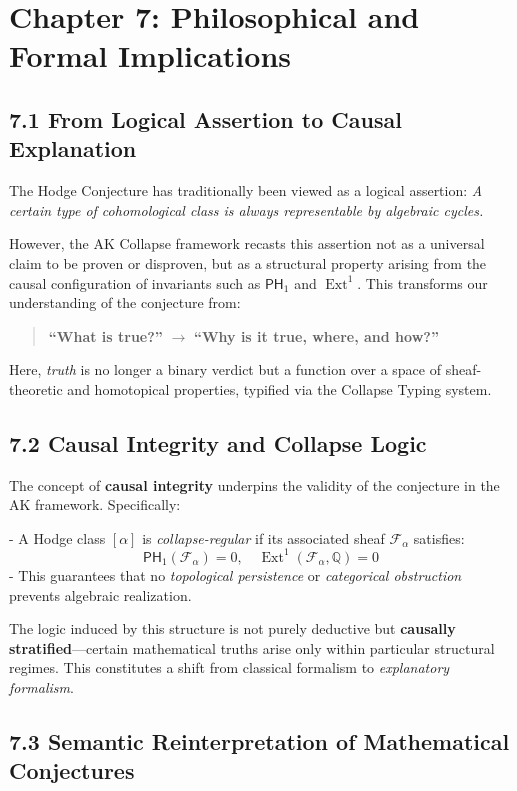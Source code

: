 \documentclass[11pt]{article}
\DeclareMathOperator{\Ext}{Ext}
\begin{document}
\section{Chapter 7: Philosophical and Formal Implications}

\subsection{7.1 From Logical Assertion to Causal Explanation}

The Hodge Conjecture has traditionally been viewed as a logical assertion:  
\emph{A certain type of cohomological class is always representable by algebraic cycles.}

However, the AK Collapse framework recasts this assertion not as a universal claim to be proven or disproven, but as a structural property arising from the causal configuration of invariants such as $\mathsf{PH}_1$ and $\Ext^1$. This transforms our understanding of the conjecture from:

\begin{quote}
\textbf{“What is true?”} \quad $\longrightarrow$ \quad \textbf{“Why is it true, where, and how?”}
\end{quote}

Here, \emph{truth} is no longer a binary verdict but a function over a space of sheaf-theoretic and homotopical properties, typified via the Collapse Typing system.

\subsection{7.2 Causal Integrity and Collapse Logic}

The concept of \textbf{causal integrity} underpins the validity of the conjecture in the AK framework. Specifically:

- A Hodge class $[\alpha]$ is \emph{collapse-regular} if its associated sheaf $\mathcal{F}_\alpha$ satisfies:
  \[
  \mathsf{PH}_1(\mathcal{F}_\alpha) = 0, \quad \Ext^1(\mathcal{F}_\alpha, \mathbb{Q}) = 0
  \]
- This guarantees that no \emph{topological persistence} or \emph{categorical obstruction} prevents algebraic realization.

The logic induced by this structure is not purely deductive but \textbf{causally stratified}—certain mathematical truths arise only within particular structural regimes. This constitutes a shift from classical formalism to \emph{explanatory formalism}.

\subsection{7.3 Semantic Reinterpretation of Mathematical Conjectures}
\end{document}
